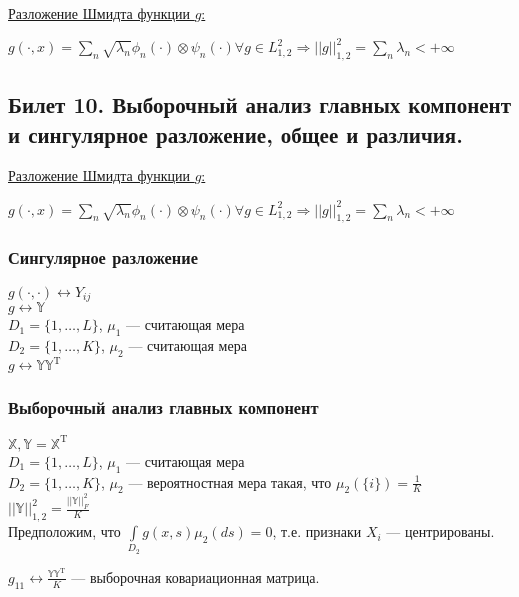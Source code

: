 \underline{Разложение Шмидта функции $g$:}

$g(\cdot,x) = \sum \limits_{n} \sqrt{\lambda_n} \phi_n (\cdot)\otimes \psi_n (\cdot) \forall g \in L_{1,2}^2 \Rightarrow ||g||_{1,2}^2 = \sum \limits_{n} \lambda_n < +\infty$

\subsection{Билет 10. Выборочный анализ главных компонент и сингулярное разложение, общее и различия.}

\underline{Разложение Шмидта функции $g$:}

$g(\cdot,x) = \sum \limits_{n} \sqrt{\lambda_n} \phi_n (\cdot)\otimes \psi_n (\cdot) \forall g \in L_{1,2}^2 \Rightarrow ||g||_{1,2}^2 = \sum \limits_{n} \lambda_n < +\infty$



\subsubsection{Сингулярное разложение}

$g(\cdot , \cdot) \leftrightarrow Y_{ij}$\\
$g \leftrightarrow \mathbb{Y}$\\

$D_1 = \{1, \dots, L\}$, $\mu_1$ --- считающая мера\\
$D_2 = \{1, \dots, K\}$, $\mu_2$ --- считающая мера\\

$g \leftrightarrow \mathbb{Y}\mathbb{Y}^{\mathrm{T}}$

\subsubsection{Выборочный анализ главных компонент}

$\mathbb{X}, \mathbb{Y} = \mathbb{X}^{\mathrm{T}}$\\
$D_1 = \{1, \dots, L\}$, $\mu_1$ --- считающая мера\\
$D_2 = \{1, \dots, K\}$, $\mu_2$ --- вероятностная мера такая, что $\mu_2(\{i\}) = \frac{1}{K}$\\
$||\mathbb{Y}||_{1,2}^2 = \frac{||\mathbb{Y}||_{F}^2}{K}$\\
Предположим, что $\int \limits_{D_2}g(x,s) \mu_2(ds) = 0$, т.е. признаки $X_i$ --- центрированы.

$g_{11} \leftrightarrow \frac{\mathbb{Y}\mathbb{Y}^{\mathrm{T}}}{K}$ --- выборочная ковариационная матрица.\\

